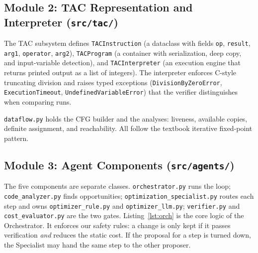 \documentclass[12pt,a4paper]{report}
\begin{document}
\subsection{Module 2: TAC Representation and Interpreter (\texttt{src/tac/})}

The TAC subsystem defines \texttt{TACInstruction} (a dataclass with fields \texttt{op}, \texttt{result}, \texttt{arg1}, \texttt{operator}, \texttt{arg2}), \texttt{TACProgram} (a container with serialization, deep copy, and input-variable detection), and \texttt{TACInterpreter} (an execution engine that returns printed output as a list of integers). The interpreter enforces C-style truncating division and raises typed exceptions (\texttt{DivisionByZeroError}, \texttt{ExecutionTimeout}, \texttt{UndefinedVariableError}) that the verifier distinguishes when comparing runs.

\texttt{dataflow.py} holds the CFG builder and the analyses: liveness, available copies, definite assignment, and reachability. All follow the textbook iterative fixed-point pattern.

\subsection{Module 3: Agent Components (\texttt{src/agents/})}

The five components are separate classes. \texttt{orchestrator.py} runs the loop; \texttt{code\_analyzer.py} finds opportunities; \texttt{optimization\_specialist.py} routes each step and owns \texttt{optimizer\_rule.py} and \texttt{optimizer\_llm.py}; \texttt{verifier.py} and \texttt{cost\_evaluator.py} are the two gates. Listing~\ref{lst:orch} is the core logic of the Orchestrator. It enforces our safety rules: a change is only kept if it passes verification \emph{and} reduces the static cost. If the proposal for a step is turned down, the Specialist may hand the same step to the other proposer.
\end{document}
